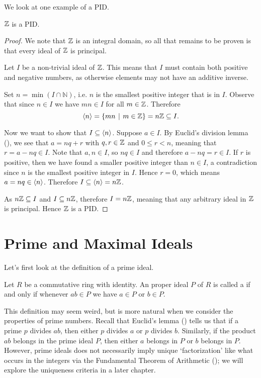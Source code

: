 We look at one example of a PID.
\begin{proposition}\label{prop-Z-is-PID}
    $\mathbb{Z}$ is a PID.
\end{proposition}
\begin{proof}
    We note that $\mathbb{Z}$ is an integral domain, so all that remains to be proven is that every ideal of $\mathbb{Z}$ is principal.

    Let $I$ be a non-trivial ideal of $\mathbb{Z}$. This means that $I$ must contain both positive and negative numbers, as otherwise elements may not have an additive inverse.

    Set $n = \min(I \cap \mathbb{N})$, i.e. $n$ is the smallest positive integer that is in $I$. Observe that since $n \in I$ we have $mn \in I$ for all $m \in \mathbb{Z}$. Therefore
    \[
        \princ{n} = \{mn \vert m \in \Z\} = n\Z \subseteq I.
    \]

    Now we want to show that $I \subseteq \left\langle n\right\rangle$. Suppose $a \in I$. By Euclid's division lemma (), we see that $a = nq + r$ with $q, r \in \mathbb{Z}$ and $0 \leq r < n$, meaning that $r = a - nq \in I$. Note that $a, n \in I$, so $nq \in I$ and therefore $a - nq = r \in I$. If $r$ is positive, then we have found a smaller positive integer than $n \in I$, a contradiction since $n$ is the smallest positive integer in $I$. Hence $r = 0$, which means $a = nq \in \left\langle n\right\rangle$. Therefore $I \subseteq \left\langle n\right\rangle = n\mathbb{Z}$.

    As $n\mathbb{Z} \subseteq I$ and $I \subseteq n\mathbb{Z}$, therefore $I = n\mathbb{Z}$, meaning that any arbitrary ideal in $\mathbb{Z}$ is principal. Hence $\mathbb{Z}$ is a PID.
\end{proof}

\section{Prime and Maximal Ideals}\label{section-prime-and-maximal-ideals}
Let's first look at the definition of a prime ideal.

\begin{definition}
    Let $R$ be a commutative ring with identity. An proper ideal $P$ of $R$ is called a  if and only if whenever $ab \in P$ we have $a \in P$ or $b \in P$.
\end{definition}

This definition may seem weird, but is more natural when we consider the properties of prime numbers. Recall that Euclid's lemma () tells us that if a prime $p$ divides $ab$, then either $p$ divides $a$ or $p$ divides $b$. Similarly, if the product $ab$ belongs in the prime ideal $P$, then either $a$ belongs in $P$ or $b$ belongs in $P$. However, prime ideals does not necessarily imply unique `factorization' like what occurs in the integers via the Fundamental Theorem of Arithmetic (); we will explore the uniqueness criteria in a later chapter.

